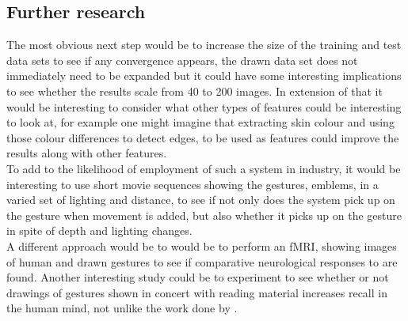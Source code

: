 \documentclass[11pt, a4paper]{article}
\begin{document}
\subsection{Further research}
The most obvious next step would be to increase the size of the training and test data sets to see if any convergence appears, the drawn data set does not immediately need to be expanded but it could have some interesting implications to see whether the results scale from 40 to 200 images. In extension of that it would be interesting to consider what other types of features could be interesting to look at, for example one might imagine that extracting skin colour and using those colour differences to detect edges, to be used as features could improve the results along with other features.\\
To add to the likelihood of employment of such a system in industry, it would be interesting to use short movie sequences showing the gestures, emblems, in a varied set of lighting and distance, to see if not only does the system pick up on the gesture when movement is added, but also whether it picks up on the gesture in spite of depth and lighting changes.\\
A different approach would be to would be to perform an fMRI, showing images of human and drawn gestures to see if comparative neurological responses  to  are found. Another interesting study could be to experiment to see whether or not drawings of gestures shown in concert with reading material increases recall in the human mind, not unlike the work done by .


\end{document}
